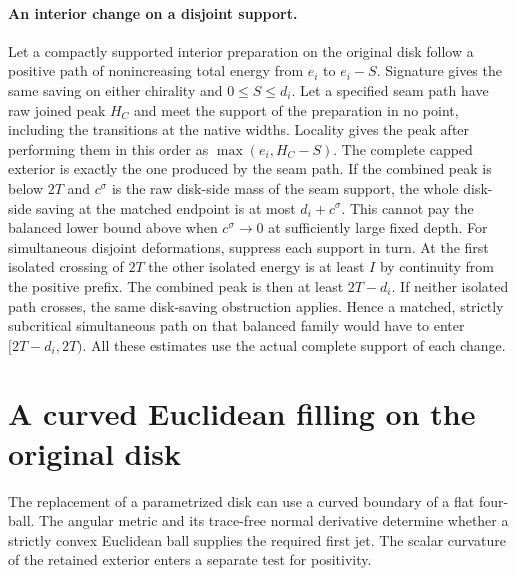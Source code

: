 \documentclass[11pt,letterpaper]{article}
\numberwithin{equation}{section}
\begin{document}
\paragraph{An interior change on a disjoint support.}
Let a compactly supported interior preparation on the original disk
follow a positive path of nonincreasing total energy from \(e_i\) to
\(e_i-S\). Signature gives the same saving on either chirality
and \(0\le S\le d_i\). Let a specified seam path have raw joined peak
\(H_C\) and meet the support of the preparation in no point,
including the transitions at the native widths. Locality gives the
peak after performing them in this order as
\(\max(e_i,H_C-S)\). The complete capped exterior is exactly the
one produced by the seam path. If the combined peak is below \(2T\)
and \(c^\sigma\) is the raw disk-side mass of the seam support, the
whole disk-side saving at the matched endpoint is at most
\(d_i+c^\sigma\). This cannot pay the balanced lower bound above
when \(c^\sigma\to0\) at sufficiently large fixed depth. For
simultaneous disjoint deformations, suppress each support in turn.
At the first isolated crossing of \(2T\) the other isolated energy
is at least \(I\) by continuity from the positive prefix. The
combined peak is then at least \(2T-d_i\). If neither isolated
path crosses, the same disk-saving obstruction applies. Hence a
matched, strictly subcritical simultaneous path on that balanced
family would have to enter \([2T-d_i,2T)\). All these estimates
use the actual complete support of each change.

\section{A curved Euclidean filling on the original disk}\label{sec:convex}

The replacement of a parametrized disk can use a curved boundary of a
flat four-ball. The angular metric and its trace-free normal derivative
determine whether a strictly convex Euclidean ball supplies the required
first jet. The scalar curvature of the retained exterior enters a
separate test for positivity.
\end{document}
